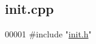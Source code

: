\hypertarget{init_8cpp_source}{}\subsection{init.\+cpp}
\label{init_8cpp_source}

\begin{DoxyCode}
00001 \textcolor{preprocessor}{#include "\mbox{\hyperlink{init_8h}{init.h}}"}
\end{DoxyCode}
